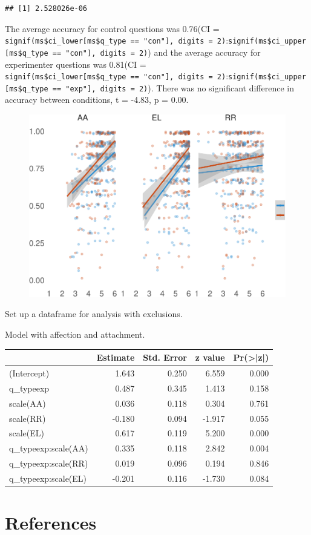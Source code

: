 \documentclass[floatsintext,man]{apa6}
\theoremstyle{definition}
\theoremstyle{definition}
\theoremstyle{definition}
\theoremstyle{remark}
\begin{document}
\begin{verbatim}
## [1] 2.528026e-06
\end{verbatim}

The average accuracy for control questions was 0.76(CI =
\texttt{signif(ms\$ci\_lower{[}ms\$q\_type\ ==\ "con"{]},\ digits\ =\ 2)}:\texttt{signif(ms\$ci\_upper{[}ms\$q\_type\ ==\ "con"{]},\ digits\ =\ 2)})
and the average accuracy for experimenter questions was 0.81(CI =
\texttt{signif(ms\$ci\_lower{[}ms\$q\_type\ ==\ "con"{]},\ digits\ =\ 2)}:\texttt{signif(ms\$ci\_upper{[}ms\$q\_type\ ==\ "exp"{]},\ digits\ =\ 2)}).
There was no significant difference in accuracy between conditions, t =
-4.83, p = 0.00.

\begin{figure}
\centering
\includegraphics{PAQ_paper_files/figure-latex/unnamed-chunk-36-1.pdf}
\caption{}
\end{figure}

Set up a dataframe for analysis with exclusions.

Model with affection and attachment.

\begin{tabular}{l|r|r|r|r}
\hline
  & Estimate & Std. Error & z value & Pr(>|z|)\\
\hline
(Intercept) & 1.643 & 0.250 & 6.559 & 0.000\\
\hline
q\_typeexp & 0.487 & 0.345 & 1.413 & 0.158\\
\hline
scale(AA) & 0.036 & 0.118 & 0.304 & 0.761\\
\hline
scale(RR) & -0.180 & 0.094 & -1.917 & 0.055\\
\hline
scale(EL) & 0.617 & 0.119 & 5.200 & 0.000\\
\hline
q\_typeexp:scale(AA) & 0.335 & 0.118 & 2.842 & 0.004\\
\hline
q\_typeexp:scale(RR) & 0.019 & 0.096 & 0.194 & 0.846\\
\hline
q\_typeexp:scale(EL) & -0.201 & 0.116 & -1.730 & 0.084\\
\hline
\end{tabular}

\newpage

\section{References}\label{references}

\begingroup
\setlength{\parindent}{-0.5in} \setlength{\leftskip}{0.5in}

\hypertarget{refs}{}

\endgroup
\end{document}
